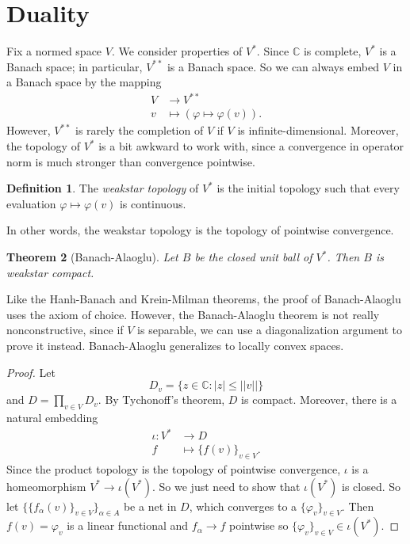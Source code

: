 \documentclass[12pt]{report}
\newcommand{\CC}{\mathbb{C}}
\newcommand{\dfn}[1]{\emph{#1}\index{#1}}
\newtheorem{theorem}{Theorem}[chapter]
\theoremstyle{definition}
\newtheorem{definition}[theorem]{Definition}
\begin{document}
\section{Duality}
    Fix a normed space $V$. We consider properties of $V^*$. Since $\CC$ is complete, $V^*$ is a Banach space; in particular, $V^{**}$ is a Banach space. So we can always embed $V$ in a Banach space by the mapping
\begin{align*}
    V &\to V^{**}\\
    v &\mapsto (\varphi \mapsto \varphi(v)).
\end{align*}
    However, $V^{**}$ is rarely the completion of $V$ if $V$ is infinite-dimensional. Moreover, the topology of $V^*$ is a bit awkward to work with, since a convergence in operator norm is much stronger than convergence pointwise.
\begin{definition}
    The \dfn{weakstar topology} of $V^*$ is the initial topology such that every evaluation $\varphi \mapsto \varphi(v)$ is continuous.
\end{definition}
    In other words, the weakstar topology is the topology of pointwise convergence.
\begin{theorem}[Banach-Alaoglu]
    Let $B$ be the closed unit ball of $V^*$. Then $B$ is weakstar compact.
\end{theorem}
    Like the Hanh-Banach and Krein-Milman theorems, the proof of Banach-Alaoglu uses the axiom of choice. However, the Banach-Alaoglu theorem is not really nonconstructive, since if $V$ is separable, we can use a diagonalization argument to prove it instead. Banach-Alaoglu generalizes to locally convex spaces.
\begin{proof}
    Let
    $$D_v = \{z \in \CC: |z| \leq ||v||\}$$
    and $D = \prod_{v \in V} D_v$. By Tychonoff's theorem, $D$ is compact. Moreover, there is a natural embedding
\begin{align*}
    \iota: V^* &\to D\\
    f &\mapsto \{f(v)\}_{v \in V}.
\end{align*}
    Since the product topology is the topology of pointwise convergence, $\iota$ is a homeomorphism $V^* \to \iota(V^*)$. So we just need to show that $\iota(V^*)$ is closed. So let $\{\{f_\alpha(v)\}_{v \in V}\}_{\alpha \in A}$ be a net in $D$, which converges to a $\{\varphi_v\}_{v \in V}$. Then $f(v) = \varphi_v$ is a linear functional and $f_\alpha \to f$ pointwise so $\{\varphi_v\}_{v \in V} \in \iota(V^*)$.
\end{proof}
\end{document}

